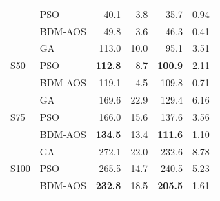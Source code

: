 \begin{table}[t]
\begin{tabular}{ll rrrr}
  & PSO          & 40.1  & 3.8   & 35.7  & 0.94 \\
  & BDM-AOS      & 49.8  & 3.6   & 46.3  & 0.41 \\
\midrule
\multirow{3}{*}{S50}
  & GA           & 113.0 & 10.0  & 95.1  & 3.51 \\
  & PSO          & \textbf{112.8} & 8.7   & \textbf{100.9} & 2.11 \\
  & BDM-AOS      & 119.1 & 4.5   & 109.8 & 0.71 \\
\midrule
\multirow{3}{*}{S75}
  & GA           & 169.6 & 22.9  & 129.4 & 6.16 \\
  & PSO          & 166.0 & 15.6  & 137.6 & 3.56 \\
  & BDM-AOS      & \textbf{134.5} & 13.4  & \textbf{111.6} & 1.10 \\
\midrule
\multirow{3}{*}{S100}
  & GA           & 272.1 & 22.0  & 232.6 & 8.78 \\
  & PSO          & 265.5 & 14.7  & 240.5 & 5.23 \\
  & BDM-AOS      & \textbf{232.8} & 18.5  & \textbf{205.5} & 1.61 \\
\bottomrule
\end{tabular}
\end{table}

